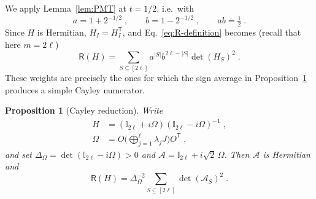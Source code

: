 \documentclass[aps,prl,twocolumn,superscriptaddress,reprint,longbibliography,nofootinbib]{revtex4-2}
\newtheorem{proposition}{Proposition}
\newcommand{\trans}{\mathsf{T}}
\begin{document}
We apply Lemma~\ref{lem:PMT} at $t=1/2$, i.e.\ with
\begin{equation}
    a=1+2^{-1/2}\;,\qquad b=1-2^{-1/2}\;,\qquad ab=\tfrac12\;.
    \label{eq:a-b}
\end{equation}
Since $H$ is Hermitian, $\overline{H_I}=H_I^{\trans}$, and Eq.~\eqref{eq:R-definition} becomes (recall that here $m=2\ell$)
\begin{equation}
    \mathsf{R}(H)=\sum_{S\subseteq[2\ell]}a^{|S|}b^{2\ell-|S|}\det(H_S)^2\;.
    \label{eq:R-weighted-principal}
\end{equation}
These weights are precisely the ones for which the sign average in Proposition~\ref{prop:Cayley} produces a simple Cayley numerator.

\begin{proposition}[Cayley reduction]
\label{prop:Cayley}
Write
\begin{equation}
\begin{split}
    H&=(\mathbb{I}_{2\ell}+i\Omega)(\mathbb{I}_{2\ell}-i\Omega)^{-1}\;,\\ \Omega&=O\Big(\bigoplus_{j=1}^{\ell}\lambda_jJ\Big)O^{\trans}\;,
    \label{eq:H-Cayley}
\end{split}
\end{equation}
and set $\Delta_\Omega=\det(\mathbb{I}_{2\ell}-i\Omega)>0$ and $\mathcal{A}=\mathbb{I}_{2\ell}+i\sqrt2\,\Omega$. Then $\mathcal{A}$ is Hermitian and
\begin{equation}
    \mathsf{R}(H)=\Delta_\Omega^{-2}\sum_{S\subseteq[2\ell]}\det(\mathcal{A}_S)^2\;.
    \label{eq:Cayley-reduction}
\end{equation}
\end{proposition}
\end{document}
